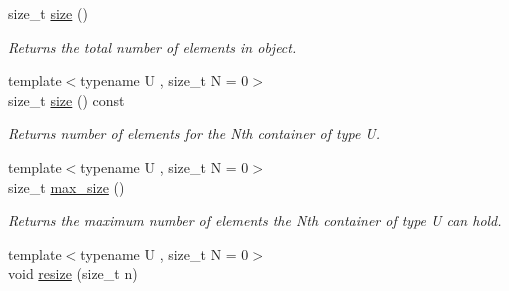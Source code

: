 \begin{DoxyCompactItemize}
\item 
\hypertarget{classheterogeneous_1_1heterodeque_3_01_t_00_01_types_8_8_8_4_a4f670a08b7d81e671c112bf762ddc29b}{}size\+\_\+t \hyperlink{classheterogeneous_1_1heterodeque_3_01_t_00_01_types_8_8_8_4_a4f670a08b7d81e671c112bf762ddc29b}{size} ()\label{classheterogeneous_1_1heterodeque_3_01_t_00_01_types_8_8_8_4_a4f670a08b7d81e671c112bf762ddc29b}

\begin{DoxyCompactList}\small\item\em Returns the total number of elements in object. \end{DoxyCompactList}\item 
\hypertarget{classheterogeneous_1_1heterodeque_3_01_t_00_01_types_8_8_8_4_a8894904e8624116a13c0abfc073f4dfa}{}{\footnotesize template$<$typename U , size\+\_\+t N = 0$>$ }\\size\+\_\+t \hyperlink{classheterogeneous_1_1heterodeque_3_01_t_00_01_types_8_8_8_4_a8894904e8624116a13c0abfc073f4dfa}{size} () const \label{classheterogeneous_1_1heterodeque_3_01_t_00_01_types_8_8_8_4_a8894904e8624116a13c0abfc073f4dfa}

\begin{DoxyCompactList}\small\item\em Returns number of elements for the Nth container of type U. \end{DoxyCompactList}\item 
\hypertarget{classheterogeneous_1_1heterodeque_3_01_t_00_01_types_8_8_8_4_ac82f38e1b0b3ba12444036efcce04168}{}{\footnotesize template$<$typename U , size\+\_\+t N = 0$>$ }\\size\+\_\+t \hyperlink{classheterogeneous_1_1heterodeque_3_01_t_00_01_types_8_8_8_4_ac82f38e1b0b3ba12444036efcce04168}{max\+\_\+size} ()\label{classheterogeneous_1_1heterodeque_3_01_t_00_01_types_8_8_8_4_ac82f38e1b0b3ba12444036efcce04168}

\begin{DoxyCompactList}\small\item\em Returns the maximum number of elements the Nth container of type U can hold. \end{DoxyCompactList}\item 
\hypertarget{classheterogeneous_1_1heterodeque_3_01_t_00_01_types_8_8_8_4_a58196c4dcbdb42828df7ef72309111f2}{}{\footnotesize template$<$typename U , size\+\_\+t N = 0$>$ }\\void \hyperlink{classheterogeneous_1_1heterodeque_3_01_t_00_01_types_8_8_8_4_a58196c4dcbdb42828df7ef72309111f2}{resize} (size\+\_\+t n)\label{classheterogeneous_1_1heterodeque_3_01_t_00_01_types_8_8_8_4_a58196c4dcbdb42828df7ef72309111f2}


\end{DoxyCompactItemize}
